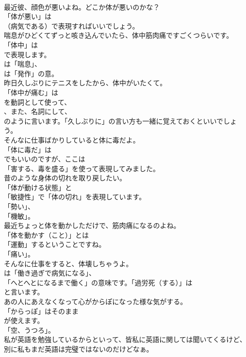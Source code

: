\documentclass[8pt]{extreport}
\begin{document}
\begin{CJK}{UTF8}{min}
\\	最近彼、顔色が悪いよね。どこか体が悪いのかな？ 
\\	「体が悪い」は
\\	（病気である）で表現すればいいでしょう。	
\\	喘息がひどくてずっと咳き込んでいたら、体中筋肉痛ですごくつらいです。 
\\	「体中」は 
\\	で表現します。
\\	は「喘息」、
\\	は「発作」の意。
\\	昨日久しぶりにテニスをしたから、体中がいたくて。 
\\	「体中が痛む」は
\\	を動詞として使って、
\\	、また、名詞にして、
\\	のように言います。「久しぶりに」の言い方も一緒に覚えておくといいでしょう。	
\\	そんなに仕事ばかりしていると体に毒だよ。 
\\	「体に毒だ」は
\\	でもいいのですが、ここは
\\	「害する、毒を盛る」を使って表現してみました。	
\\	昔のような身体の切れを取り戻したい。 
\\	「体が動ける状態」と
\\	「敏捷性」で「体の切れ」を表現しています。
\\	「勢い」、
\\	「機敏」。	
\\	最近ちょっと体を動かしただけで、筋肉痛になるのよね。 
\\	「体を動かす（こと）」とは
\\	「運動」するということですね。
\\	「痛い」。	
\\	そんなに仕事をすると、体壊しちゃうよ。 
\\	は「働き過ぎで病気になる」、
\\	「へとへとになるまで働く」の意味です。「過労死（する）」は
\\	と言います。	
\\	あの人にあえなくなって心がからぽになった様な気がする。 
\\	「からっぽ」はそのまま
\\	が使えます。
\\	「空、うつろ」。	
\\	私が英語を勉強しているからといって、皆私に英語に関しては聞いてくるけど、別に私もまだ英語は完璧ではないのだけどなぁ。 

\end{CJK}
\end{document}
